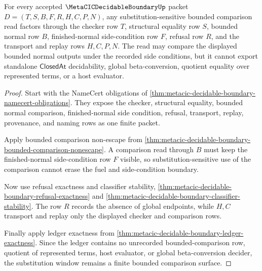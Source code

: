 \begin{theorem}
\label{thm:metacic-decidable-boundary-substitution-window}
For every accepted $\MetaCICDecidableBoundaryUp$ packet $D=(T,S,B,F,R,H,C,P,N)$, any substitution-sensitive bounded comparison read factors through the checker row $T$, structural equality row $S$, bounded normal row $B$, finished-normal side-condition row $F$, refusal row $R$, and the transport and replay rows $H,C,P,N$. The read may compare the displayed bounded normal outputs under the recorded side conditions, but it cannot export standalone $\mathsf{ClosedAt}$ decidability, global beta-conversion, quotient equality over represented terms, or a host evaluator.
\end{theorem}
\begin{proof}
Start with the NameCert obligations of \autoref{thm:metacic-decidable-boundary-namecert-obligations}. They expose the checker, structural equality, bounded normal comparison, finished-normal side condition, refusal, transport, replay, provenance, and naming rows as one finite packet.

Apply bounded comparison non-escape from \autoref{thm:metacic-decidable-boundary-bounded-comparison-nonescape}. A comparison read through $B$ must keep the finished-normal side-condition row $F$ visible, so substitution-sensitive use of the comparison cannot erase the fuel and side-condition boundary.

Now use refusal exactness and classifier stability, \autoref{thm:metacic-decidable-boundary-refusal-exactness} and \autoref{thm:metacic-decidable-boundary-classifier-stability}. The row $R$ records the absence of global endpoints, while $H,C$ transport and replay only the displayed checker and comparison rows.

Finally apply ledger exactness from \autoref{thm:metacic-decidable-boundary-ledger-exactness}. Since the ledger contains no unrecorded bounded-comparison row, quotient of represented terms, host evaluator, or global beta-conversion decider, the substitution window remains a finite bounded comparison surface.
\end{proof}

